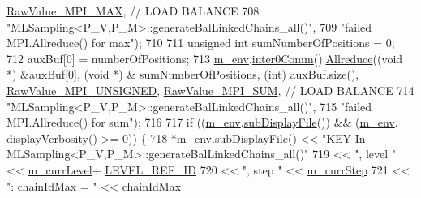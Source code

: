 \begin{DoxyCode}
      \hyperlink{_mpi_comm_8h_a68f3ac7ff71a6504e236b0c95de78178}{RawValue\_MPI\_MAX}, \textcolor{comment}{// LOAD BALANCE}
708                                  \textcolor{stringliteral}{"MLSampling<P\_V,P\_M>::generateBalLinkedChains\_all()"},
709                                  \textcolor{stringliteral}{"failed MPI.Allreduce() for max"});
710 
711     \textcolor{keywordtype}{unsigned} \textcolor{keywordtype}{int} sumNumberOfPositions = 0;
712     auxBuf[0] = numberOfPositions;
713     \hyperlink{class_q_u_e_s_o_1_1_m_l_sampling_a13f1ca4fe9f94822fe572a743eaced1d}{m\_env}.\hyperlink{class_q_u_e_s_o_1_1_base_environment_a689e4d140c74d495d97eb498714a4b82}{inter0Comm}().\hyperlink{class_q_u_e_s_o_1_1_mpi_comm_a72e137e60ef8060efb1ee5fc874fa4b8}{Allreduce}((\textcolor{keywordtype}{void} *) &auxBuf[0], (\textcolor{keywordtype}{void} *) &
      sumNumberOfPositions, (\textcolor{keywordtype}{int}) auxBuf.size(), \hyperlink{_mpi_comm_8h_a06cbfbc33436f6e0dc8a48ff3c49bdfc}{RawValue\_MPI\_UNSIGNED}, 
      \hyperlink{_mpi_comm_8h_afbf78d291c032aa7f512bc566cee2bd1}{RawValue\_MPI\_SUM}, \textcolor{comment}{// LOAD BALANCE}
714                                  \textcolor{stringliteral}{"MLSampling<P\_V,P\_M>::generateBalLinkedChains\_all()"},
715                                  \textcolor{stringliteral}{"failed MPI.Allreduce() for sum"});
716 
717     \textcolor{keywordflow}{if} ((\hyperlink{class_q_u_e_s_o_1_1_m_l_sampling_a13f1ca4fe9f94822fe572a743eaced1d}{m\_env}.\hyperlink{class_q_u_e_s_o_1_1_base_environment_a8a0064746ae8dddfece4229b9ad374d6}{subDisplayFile}()) && (\hyperlink{class_q_u_e_s_o_1_1_m_l_sampling_a13f1ca4fe9f94822fe572a743eaced1d}{m\_env}.
      \hyperlink{class_q_u_e_s_o_1_1_base_environment_a1fe5f244fc0316a0ab3e37463f108b96}{displayVerbosity}() >= 0)) \{
718       *\hyperlink{class_q_u_e_s_o_1_1_m_l_sampling_a13f1ca4fe9f94822fe572a743eaced1d}{m\_env}.\hyperlink{class_q_u_e_s_o_1_1_base_environment_a8a0064746ae8dddfece4229b9ad374d6}{subDisplayFile}() << \textcolor{stringliteral}{"KEY In
       MLSampling<P\_V,P\_M>::generateBalLinkedChains\_all()"}
719                               << \textcolor{stringliteral}{", level "}               << \hyperlink{class_q_u_e_s_o_1_1_m_l_sampling_af9416874c856e50f3b35270e801f17e4}{m\_currLevel}+
      \hyperlink{_m_l_sampling_level_options_8h_a68d15eaf394d210effcf584b938206d3}{LEVEL\_REF\_ID}
720                               << \textcolor{stringliteral}{", step "}                << \hyperlink{class_q_u_e_s_o_1_1_m_l_sampling_a1b1f8ccb4823bdfa26ec652f0807c63e}{m\_currStep}
721                               << \textcolor{stringliteral}{": chainIdMax = "}        << chainIdMax

\end{DoxyCode}
